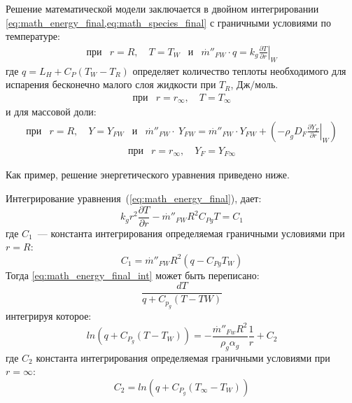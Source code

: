 Решение математической модели заключается в двойном интегрировании \cref{eq:math_energy_final,eq:math_species_final} с граничными условиями по температуре:
\begin{equation*}
\begin{array}{cccc}
\text{при} & r=R,\quad T=T_{W} & \text{и} & {\stackrel{.}{m}}''_{FW}\cdot q= k_{g} \left.{\frac{\partial T}{\partial r}}\right\vert_{W}
\end{array}
\end{equation*}
где \( q={L}_{H}+{C}_{P}\left({T}_{W}-{T}_{R}\right) \) определяет количество теплоты необходимого для испарения бесконечно малого  слоя жидкости при \(T_{R}\), \(\text{Дж}/\text{моль}\).
\begin{equation*}
\begin{array}{cc}
\text{при} & r=r_{\infty},\quad T=T_{\infty}
\end{array}
\end{equation*}
и для массовой доли:
\begin{equation*}
\begin{array}{cccc}
\text{при} & r=R,\quad Y=Y_{FW} & \text{и} & {\stackrel{.}{m}}''_{FW}\cdot\ Y_{FW}= {\stackrel{.}{m}}''_{FW}\cdot Y_{FW}+\left( -\rho_{g}D_F \left.{\frac{\partial Y_{F}}{\partial r}}\right\vert_{W}\right)
\end{array}
\end{equation*}
\begin{equation*}
\begin{array}{cc}
\text{при} & r=r_{\infty},\quad Y_{F}=Y_{F\infty}
\end{array}
\end{equation*}

Как пример, решение энергетического уравнения приведено ниже.

Интегрирование уравнения~(\ref{eq:math_energy_final}), дает:
\begin{equation}
{k}_{g}{r}^{2}\frac{\partial T}{\partial r}-{\stackrel{.}{m}}''_{FW}R^{2}{C}_{Pg}T=C_{1}\label{eq:math_energy_final_int}
\end{equation}
где \(C_{1}\)~--- константа интегрирования определяемая граничными условиями при \(r=R\):
\begin{equation}
C_{1}={\stackrel{.}{m}}''_{FW}R^{2}\left(q-{C}_{Pg}T_{W}\right)
\end{equation}
Тогда \cref{eq:math_energy_final_int} может быть переписано:
\begin{equation}
 \frac{dT}{q+{C}_{{p}_{g}}\left(T-TW\right)} 
\end{equation}
интегрируя которое:
\begin{equation}
 ln\left(q+{C}_{{P}_{g}}\left(T-{T}_{W}\right)\right)=-\frac{{\stackrel{.}{m}}''_{Fw}{R}^{2}}{{\rho }_{g}{\alpha }_{g}}\frac{1}{r}+{C}_{2} \label{eq:math_energy_final_int2}
\end{equation}
где \(C_2\) константа интегрирования определяемая граничными условиями при \(r=\infty\):
\begin{equation}
C_{2}=ln\left(q+{C}_{{P}_{g}}\left(T_{\infty}-{T}_{W}\right)\right)
\end{equation}

